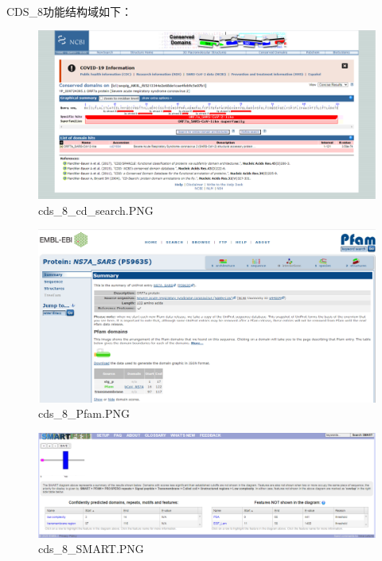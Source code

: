 \documentclass[supercite]{HustGraduPaper}
\begin{document}
	\paragraph{}\label{subpara:subpara}CDS\_8功能结构域如下：
	\begin{figure}[H]
		\centering
		\includegraphics[width=1\textwidth]{./material/practice2/cds_8/cd_search.png}
		\caption{cds\_8\_cd\_search.PNG}
	\end{figure}
	\begin{figure}[H]
		\centering
		\includegraphics[width=1\textwidth]{./material/practice2/cds_8/Pfam.png}
		\caption{cds\_8\_Pfam.PNG}
	\end{figure}
	\begin{figure}[H]
		\centering
		\includegraphics[width=1\textwidth]{./material/practice2/cds_8/SMART.png}
		\caption{cds\_8\_SMART.PNG}
	\end{figure}
\end{document}
